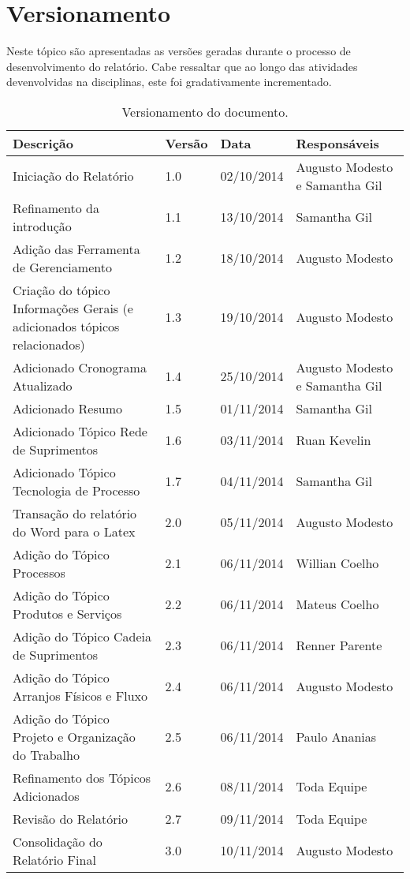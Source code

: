 \chapter[Versionamento]{Versionamento}
\label{chap:versionamento}
	Neste tópico são apresentadas as versões geradas durante o processo de desenvolvimento do relatório. Cabe ressaltar que ao longo das atividades devenvolvidas na disciplinas, este foi gradativamente incrementado.
	
	\label{subsubsec:versionamento_talbe}
		\begin{table}[h]
			\centering
			\begin{tabular}{|p{6cm}|p{1.5cm}|p{2.5cm}|p{4cm}|}
				
				\hline
				
				Descrição & Versão & Data & Responsáveis \\ \hline
				Iniciação do Relatório & 1.0 & 02/10/2014 & Augusto Modesto e Samantha Gil \\ \hline
				Refinamento da introdução & 1.1 & 13/10/2014 & Samantha Gil \\ \hline
				Adição das Ferramenta de Gerenciamento & 1.2 & 18/10/2014 & Augusto Modesto \\ \hline
				Criação do tópico Informações Gerais (e adicionados tópicos relacionados) & 1.3 & 19/10/2014 & Augusto Modesto \\ \hline
				Adicionado Cronograma Atualizado & 1.4 & 25/10/2014 & Augusto Modesto e Samantha Gil \\ \hline
				Adicionado Resumo & 1.5 & 01/11/2014 & Samantha Gil \\ \hline
				Adicionado Tópico Rede de Suprimentos & 1.6 & 03/11/2014 & Ruan Kevelin \\ \hline
				Adicionado Tópico Tecnologia de Processo & 1.7 & 04/11/2014 & Samantha Gil \\ \hline
				Transação do relatório do Word para o Latex & 2.0 & 05/11/2014 & Augusto Modesto \\ \hline
				Adição do Tópico Processos & 2.1 & 06/11/2014 & Willian Coelho \\ \hline
				Adição do Tópico Produtos e Serviços & 2.2 & 06/11/2014 & Mateus Coelho \\ \hline
				Adição do Tópico Cadeia de Suprimentos & 2.3 & 06/11/2014 & Renner Parente \\ \hline
				Adição do Tópico Arranjos Físicos e Fluxo & 2.4 & 06/11/2014 & Augusto Modesto \\ \hline
				Adição do Tópico Projeto e Organização do Trabalho & 2.5 & 06/11/2014 & Paulo Ananias \\ \hline
				Refinamento dos Tópicos Adicionados & 2.6 & 08/11/2014 & Toda Equipe \\ \hline
				Revisão do Relatório & 2.7 & 09/11/2014 & Toda Equipe \\ \hline
				Consolidação do Relatório Final & 3.0 & 10/11/2014 & Augusto Modesto \\ \hline				

			\end{tabular}
			\caption[Versionamento do Documento]{Versionamento do documento.}
			\label{tab:versionamento_tabl}
		\end{table}
